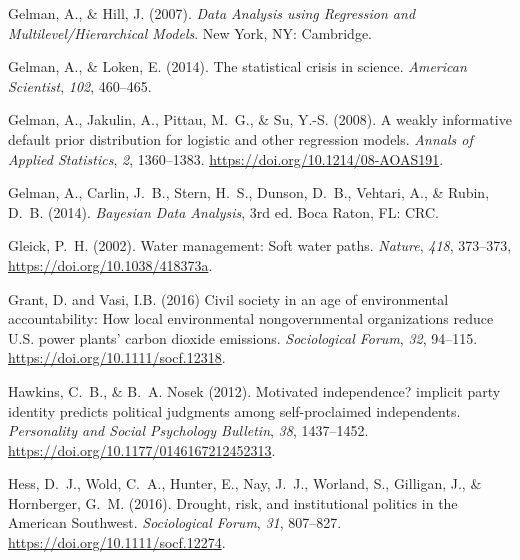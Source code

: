 \documentclass[draft]{agujournal}\usepackage{knitr}
\begin{document}
\begin{thebibliography}{33}
  Gelman, A., \& Hill, J. (2007).
  \textit{Data Analysis using Regression and Multilevel/Hierarchical Models}.
  New York, NY: Cambridge.

  Gelman, A., \& Loken, E. (2014).
  The statistical crisis in science.
  \textit{American Scientist}, \textit{102}, 460--465.

  Gelman, A., Jakulin, A., Pittau, M.~G., \& Su, Y.-S. (2008).
  A weakly informative default prior distribution for logistic and other
  regression models.
  \textit{Annals of Applied Statistics}, \textit{2}, 1360--1383.
  \url{https://doi.org/10.1214/08-AOAS191}.

  Gelman, A., Carlin, J.~B., Stern, H.~S., Dunson, D.~B., Vehtari, A., \&
  Rubin, D.~B. (2014).
  \textit{{B}ayesian Data Analysis}, 3rd ed.
  Boca Raton, FL: CRC.

  Gleick, P.~H. (2002).
  Water management: {S}oft water paths.
  \textit{Nature},
  \textit{418}, 373--373, \url{https://doi.org/10.1038/418373a}.

  Grant, D. and Vasi, I.B. (2016)
  Civil society in an age of environmental accountability:
  How local environmental nongovernmental organizations reduce
  U.S. power plants' carbon dioxide emissions.
  \textit{Sociological Forum}, \textit{32}, 94--115.
  \url{https://doi.org/10.1111/socf.12318}.

  Hawkins, C.~B., \& B.~A. Nosek (2012).
  Motivated independence? implicit party identity predicts political judgments
  among self-proclaimed independents.
  \textit{Personality and Social Psychology Bulletin}, \textit{38}, 1437--1452.
  \url{https://doi.org/10.1177/0146167212452313}.

  Hess, D.~J., Wold, C.~A., Hunter, E., Nay, J.~J., Worland, S., Gilligan, J.,
  \& Hornberger, G.~M. (2016).
  Drought, risk, and institutional politics in the {A}merican {S}outhwest.
  \textit{Sociological Forum}, \textit{31}, 807--827.
  \url{https://doi.org/10.1111/socf.12274}.


\end{thebibliography}
\end{document}
